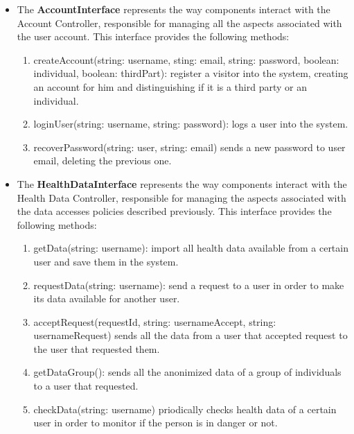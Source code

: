 \documentclass[12pt]{article}
\begin{document}
\begin{itemize}
    \item The \textbf{AccountInterface} represents the way components interact with the Account Controller, responsible for managing all the aspects associated with the user account. This interface provides the following methods: 
    \begin{enumerate}
        \item createAccount(string: username, sting: email, string: password, boolean: individual, boolean: thirdPart): register a visitor into the system, creating an account for him and distinguishing if it is a third party or an individual. 
        \item loginUser(string: username, string: password): logs a user into the system. 
        \item recoverPassword(string: user, string: email) sends a new password to user email, deleting the previous one. 
    \end{enumerate}
    \newpage 
    \item The \textbf{HealthDataInterface} represents the way components interact with the Health Data Controller, responsible for managing the aspects associated with the data accesses policies described previously. This interface provides the following methods: \begin{enumerate}
        \item getData(string: username): import all health data available from a certain user and save them in the system.
        \item requestData(string: username): send a request to a user in order to make its data available for another user. 
        \item acceptRequest(requestId, string: usernameAccept, string: usernameRequest) sends all the data from a user that accepted request to the user that requested them. 
        \item getDataGroup(): sends all the anonimized data of a group of individuals to a user that requested. 
        \item checkData(string: username) priodically checks health data of a certain user in order to monitor if the person is in danger or not.
    \end{enumerate}
    

\end{itemize}
\end{document}
